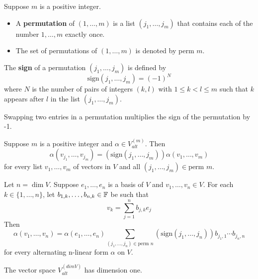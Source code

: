 \documentclass{extarticle}
\begin{document}
\begin{definition}
    Suppose \(m\) is a positive integer. 
    \begin{itemize}
        \item A \textbf{permutation} of \((1, \ldots, m)\) is a list \((j_1, \ldots, j_m)\) that contains 
        each of the number \(1, \ldots, m\) exactly once. 
        \item The set of permutations of \((1, \ldots, m)\) is denoted by perm \(m\). 
    \end{itemize}
\end{definition}

\begin{definition}
    The \textbf{sign} of a permutation \((j_1, \ldots, j_m)\) is defined by 
    \[\text{sign}(j_1, \ldots, j_m) = (-1)^N\]
    where \(N\) is the number of pairs of integers \((k, l)\) with \(1 \leq k < l \leq m\) such that 
    \(k\) appears after \(l\) in the list \((j_1, \ldots, j_m)\).
\end{definition}

\begin{lemma}
    Swapping two entries in a permutation multiplies the sign of the permutation by -1.
\end{lemma}

\begin{lemma}
    Suppose \(m\) is a positive integer and \(\alpha \in V_{alt}^{(m)}\). Then 
    \[\alpha(v_{j_1}, \ldots, v_{j_m}) = \left( \text{sign} \left( j_1, \ldots, j_m \right) \right) 
    \alpha \left( v_1, \ldots, v_m \right)\]
    for every list \(v_1, \ldots, v_m\) of vectors in \(V\) and all \((j_1, \ldots, j_m) \in \text{perm } m\).
\end{lemma}

\begin{thm}
    Let \(n = \dim V\). Suppose \(e_1, \ldots, e_n\) is a basis of \(V\) and \(v_1, \ldots, v_n \in V\). For 
    each \(k \in \{1, \ldots, n\}\), let \(b_{1, k}, \ldots, b_{n, k} \in \mathbb{F}\) be such that 
    \[v_k = \sum_{j=1}^{n} b_{j, k} e_j\]
    Then 
    \[\alpha(v_1, \ldots, v_n) = \alpha(e_1, \ldots, e_n) \sum_{(j_1, \ldots, j_n) \in \text{perm } n} 
    \left( \text{sign} \left( j_1, \ldots, j_n \right) \right) b_{j_1 , 1} \cdots b_{j_n, n}\]
    for every alternating n-linear form \(\alpha\) on \(V\).
\end{thm}

\begin{thm}
    The vector space \(V_{alt}^{(dim V)}\) has dimension one.
\end{thm}
\end{document}

